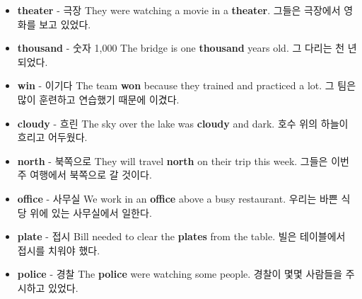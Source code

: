 \documentclass{article}
\begin{document}
\begin{addmargin}[1em]{1em}
\begin{itemize}
        \item \fontsize{12pt}{14pt}\selectfont \textbf{theater} - 극장 \newline
        They were watching a movie in a \textbf{theater}. \newline
        그들은 극장에서 영화를 보고 있었다.

        \item \fontsize{12pt}{14pt}\selectfont \textbf{thousand} - 숫자 1,000 \newline
        The bridge is one \textbf{thousand} years old. \newline
        그 다리는 천 년 되었다.

        \item \fontsize{12pt}{14pt}\selectfont \textbf{win} - 이기다 \newline
        The team \textbf{won} because they trained and practiced a lot. \newline
        그 팀은 많이 훈련하고 연습했기 때문에 이겼다.

        \item \fontsize{12pt}{14pt}\selectfont \textbf{cloudy} - 흐린 \newline
        The sky over the lake was \textbf{cloudy} and dark. \newline
        호수 위의 하늘이 흐리고 어두웠다.

        \item \fontsize{12pt}{14pt}\selectfont \textbf{north} - 북쪽으로 \newline
        They will travel \textbf{north} on their trip this week. \newline
        그들은 이번 주 여행에서 북쪽으로 갈 것이다.

        \item \fontsize{12pt}{14pt}\selectfont \textbf{office} - 사무실 \newline
        We work in an \textbf{office} above a busy restaurant. \newline
        우리는 바쁜 식당 위에 있는 사무실에서 일한다.

        \item \fontsize{12pt}{14pt}\selectfont \textbf{plate} - 접시 \newline
        Bill needed to clear the \textbf{plates} from the table. \newline
        빌은 테이블에서 접시를 치워야 했다.

        \item \fontsize{12pt}{14pt}\selectfont \textbf{police} - 경찰 \newline
        The \textbf{police} were watching some people. \newline
        경찰이 몇몇 사람들을 주시하고 있었다.


\end{itemize}
\end{addmargin}
\end{document}
